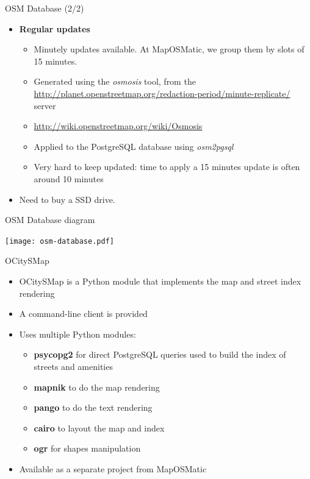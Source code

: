 \documentclass{beamer}
\begin{document}
\begin{frame}{OSM Database (2/2)}
  \begin{itemize}
  \item {\bf Regular updates}
    \begin{itemize}
    \item Minutely updates available. At MapOSMatic, we group them by
      slots of 15 minutes.
    \item Generated using the {\em osmosis} tool, from the
      \url{http://planet.openstreetmap.org/redaction-period/minute-replicate/}
      server
    \item \url{http://wiki.openstreetmap.org/wiki/Osmosis}
    \item Applied to the PostgreSQL database using {\em osm2pgsql}
    \item Very hard to keep updated: time to apply a 15 minutes update
      is often around 10 minutes
    \end{itemize}
  \item Need to buy a SSD drive.
  \end{itemize}
\end{frame}

\begin{frame}{OSM Database diagram}
  \begin{center}
    \texttt{[image: osm-database.pdf]}
  \end{center}
\end{frame}

\begin{frame}{OCitySMap}
  \begin{itemize}
  \item OCitySMap is a Python module that implements the map and
    street index rendering
  \item A command-line client is provided
  \item Uses multiple Python modules:
    \begin{itemize}
    \item {\bf psycopg2} for direct PostgreSQL queries used to build
      the index of streets and amenities
    \item {\bf mapnik} to do the map rendering
    \item {\bf pango} to do the text rendering
    \item {\bf cairo} to layout the map and index
    \item {\bf ogr} for shapes manipulation
    \end{itemize}
  \item Available as a separate project from MapOSMatic
  \end{itemize}
\end{frame}
\end{document}
